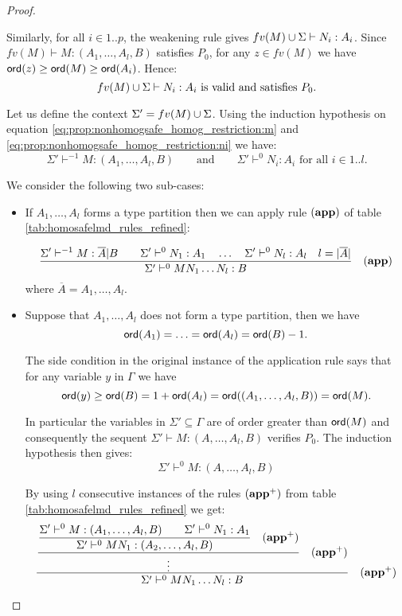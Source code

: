 \begin{proof}
\begin{itemize}
Similarly, for all $i \in 1..p$, the weakening rule gives $fv(M) \cup \Sigma \vdash N_i : A_i$.
Since $fv(M) \vdash M : (A_1,\ldots,A_l,B)$ satisfies $P_0$,
for any $z \in fv(M)$ we have ${\sf ord}(z) \geq {\sf ord}(M) \geq {\sf ord}(A_i)$. Hence:
\begin{equation}
fv(M) \cup \Sigma \vdash N_i : A_i \mbox{ is valid and satisfies }
P_0 \label{eq:prop:nonhomogsafe_homog_restriction:ni}.
\end{equation}

Let us define the context $\Sigma' = fv(M) \cup \Sigma$. Using the induction hypothesis on equation
\ref{eq:prop:nonhomogsafe_homog_restriction:m} and \ref{eq:prop:nonhomogsafe_homog_restriction:ni} we have:
$$
\Sigma' \vdash^{-1} M : (A_1,\ldots,A_l,B) \qquad \mbox{and} \qquad
\Sigma' \vdash^0 N_i : A_i \mbox{ for all } i \in 1..l.
$$


We consider the following two sub-cases:
\begin{itemize}
\item If $A_1, \ldots, A_l$ forms a type partition then we can apply
rule $\mathbf{(app)}$ of table \ref{tab:homosafelmd_rules_refined}:

$$ \frac{\displaystyle \Sigma' \vdash^{-1} M : \overline{A} | B
                                        \qquad \Sigma' \vdash^{0} N_1 :
                                        A_1
                                        \quad \ldots \quad \Sigma' \vdash^{0} N_l :
                                        A_l
                                        \quad l = |\overline{A}|
                                        }{\Sigma'  \vdash^{0} M N_1 \ldots N_l : B} \quad  \mathbf{(app)}
$$
where $\overline{A} = A_1, \ldots, A_l$.

\item  Suppose that $A_1, \ldots, A_l$ does not form a type partition, then we
have $${\sf ord}(A_1) = \ldots = {\sf ord}(A_l) = {\sf ord}(B) - 1.$$

The side condition in the original instance of the application rule
says that for any variable $y$ in $\Gamma$ we have
$${\sf ord}(y) \geq {\sf ord}(B) = 1 + {\sf ord}(A_l) = {\sf ord}((A_1,\ldots, A_l,B)) = {\sf ord}(M).$$

In particular the variables in $\Sigma' \subseteq \Gamma$ are of order greater than ${\sf ord}(M)$ and consequently
the sequent $\Sigma' \vdash M : (A,\ldots,A_l,B)$ verifies $P_0$. The induction hypothesis then gives:
$$\Sigma' \vdash^0 M : (A,\ldots,A_l,B)$$

By using $l$ consecutive instances of the rules $\mathbf{(app^+)}$ from table \ref{tab:homosafelmd_rules_refined} we get:
$$  \frac{\displaystyle  \frac{\displaystyle  \frac{\displaystyle  \Sigma' \vdash^0 M : (A_1,\ldots, A_l,B)
                    \qquad \Sigma'\vdash^{0} N_1 : A_1
                    }{ \Sigma' \vdash^0 M N_1 : (A_2,\ldots, A_l,B)} \quad \mathbf{(app^+)}
          }{ \vdots
          }
          \quad \mathbf{(app^+)}
       }{ \Sigma'  \vdash^{0} M N_1 \ldots N_l : B } \quad \mathbf{(app^+)}
$$
\end{itemize}


\end{itemize}
\end{proof}
